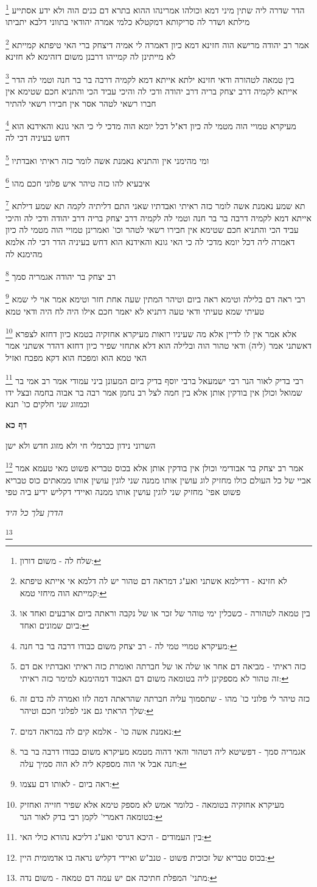 \documentclass[12pt, openany]{book}
\newcommand{\sethebfont}{
\fontsize{10.5pt}{21.0pt} \selectfont
}
\newcommand{\twocol}[1]{
	{\sethebfont \begin{multicols}{2}
			#1
	\end{multicols}}	
}
\newcommand{\sectname}{}
\newcommand{\newsection}[1]{
	\renewcommand{\sectname}{#1}	
	\vspace{-\baselineskip}
	\begin{center}
		\textbf{%
\fontsize{16pt}{16pt}\selectfont
			#1}
	\end{center}
	\vspace{-\baselineskip}
	\nopagebreak
}
\newcommand{\footnotecomment}[1]{
	\renewcommand\thefootnote{}
	\footnote{#1}}
\newcommand{\commenta}[1]{\footnotecomment{#1}}
\begin{document}
{{\commenta{שלח לה - משום דורון:}
הדר שדרה ליה שתין מיני דמא וכולהו אמרינהו ההוא בתרא דם כנים הוה ולא ידע אסתייע מילתא ושדר לה סריקותא דמקטלא כלמי אמרה יהודאי בתווני דלבא יתביתו 
\commenta{לא חזינא - דדילמא אשתני ואע"ג דמראה דם טהור יש לה דלמא אי אייתא טיפתא קמייתא הוה מיחזי טמא:}
אמר רב יהודה מרישא הוה חזינא דמא כיון דאמרה לי אמיה דיצחק ברי האי טיפתא קמייתא לא מייתינן לה קמייהו דרבנן משום דזהימא לא חזינא
\commenta{בין טמאה לטהורה - כשכלין ימי טוהר של זכר או של נקבה וראתה ביום ארבעים ואחד או ביום שמונים ואחד:}
בין טמאה לטהורה ודאי חזינא 
ילתא אייתא דמא לקמיה דרבה בר בר חנה וטמי לה הדר אייתא לקמיה דרב יצחק בריה דרב יהודה ודכי לה 
והיכי עביד הכי והתניא חכם שטימא אין חברו רשאי לטהר אסר אין חבירו רשאי להתיר 
\commenta{מעיקרא טמויי טמי לה - רב יצחק משום כבודו דרבה בר בר חנה:}
מעיקרא טמויי הוה מטמי לה כיון דא"ל דכל יומא הוה מדכי לי כי האי גונא והאידנא הוא דחש בעיניה דכי לה 
\commenta{כזה ראיתי - מביאה דם אחר או שלה או של חברתה ואומרת כזה ראיתי ואבדתיו אם דם זה טהור לא מספקינן ליה בטומאה משום דם האבוד דמהימנא למימר כזה ראיתי: }
ומי מהימני אין והתניא נאמנת אשה לומר כזה ראיתי ואבדתיו 
\commenta{כזה טיהר לי פלוני כו' מהו - שתסמוך עליה חברתה שהראתה דמה לזו ואמרה לה כדם זה שלך הראתי גם אני לפלוני חכם וטיהר:}
איבעיא להו כזה טיהר איש פלוני חכם מהו 
\commenta{נאמנת אשה כו' - אלמא קים לה במראה דמים:}
תא שמע נאמנת אשה לומר כזה ראיתי ואבדתיו שאני התם דליתיה לקמה 
תא שמע דילתא אייתא דמא לקמיה דרבה בר בר חנה וטמי לה לקמיה דרב יצחק בריה דרב יהודה ודכי לה והיכי עביד הכי והתניא חכם שטימא אין חבירו רשאי לטהר וכו' 
ואמרינן טמויי הוה מטמי לה כיון דאמרה ליה דכל יומא מדכי לה כי האי גונא והאידנא הוא דחש בעיניה הדר דכי לה אלמא מהימנא לה 
\commenta{אגמריה סמך - דפשיטא ליה דטהור והאי דהוה מטמא מעיקרא משום כבודו דרבה בר בר חנה אבל אי הוה מספקא ליה לא הוה סמיך עלה:}
רב יצחק בר יהודה אגמריה סמך 
\commenta{ראה ביום - לאותו דם עצמו:}
רבי ראה דם בלילה וטימא ראה ביום וטיהר המתין שעה אחת חזר וטימא אמר אוי לי שמא טעיתי 
שמא טעיתי ודאי טעה דתניא לא יאמר חכם אילו היה לח היה ודאי טמא
\commenta{מעיקרא אחזקיה בטומאה - כלומר אמש לא מספק טימא אלא שפיר חזייה ואחזיק בטומאה דאמרי' לקמן רבי בדק לאור הנר:}
אלא אמר אין לו לדיין אלא מה שעיניו רואות מעיקרא אחזקיה בטמא כיון דחזא לצפרא דאשתני אמר (ליה) ודאי טהור הוה ובלילה הוא דלא אתחזי שפיר כיון דחזא דהדר אשתני אמר האי טמא הוא ומפכח הוא דקא מפכח ואזיל 
\commenta{בין העמודים - היכא דגרסי ואע"ג דליכא נהורא כולי האי:}
רבי בדיק לאור הנר רבי ישמעאל ברבי יוסף בדיק ביום המעונן ביני עמודי אמר רב אמי בר שמואל וכולן אין בודקין אותן אלא בין חמה לצל רב נחמן אמר רבה בר אבוה בחמה ובצל ידו
וכמזוג שני חלקים כו' תנא
\clearpage}

\newsection{דף כא}
\twocol{השרוני נידון ככרמלי חי ולא מזוג חדש ולא ישן 
\commenta{בכוס טבריא של זכוכית פשוט - טנב"ש ואיידי דקליש נראה בו אדמומית היין:}
אמר רב יצחק בר אבודימי וכולן אין בודקין אותן אלא בכוס טבריא פשוט מאי טעמא אמר אביי של כל העולם כולו מחזיק לוג עושין אותו ממנה שני לוגין עושין אותו ממאתים כוס טבריא פשוט אפי' מחזיק שני לוגין עושין אותו ממנה ואיידי דקליש ידיע ביה טפי
\par \par {\large\emph{הדרן עלך כל היד}}\par \par 
\commenta{מתני' המפלת חתיכה אם יש עמה דם טמאה - משום נדה:}

}}
\end{document}
